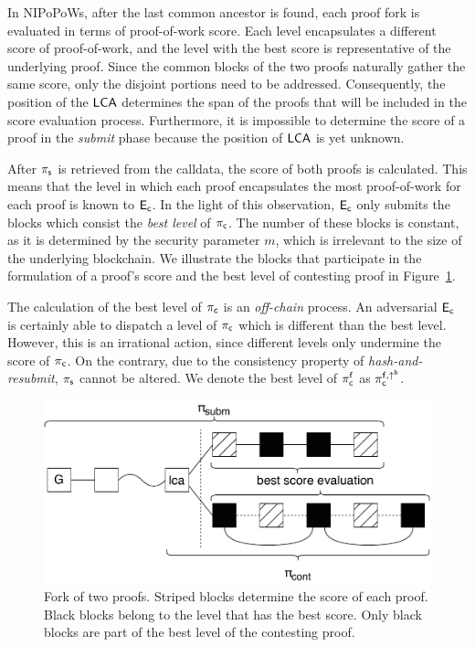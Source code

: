 In NIPoPoWs, after the last common ancestor is found, each proof fork
is evaluated in terms of proof-of-work score. Each level encapsulates a different
score of proof-of-work, and the level with the best score is representative
of the underlying proof. Since the common blocks of the two proofs naturally
gather the same score, only the disjoint portions need to be addressed.
Consequently, the position of the $\mathsf{LCA}$ determines the span of the proofs that
will be included in the score evaluation process. Furthermore, it is impossible
to determine the score of a proof in the \emph{submit} phase because the position
of $\mathsf{LCA}$ is yet unknown.

After $\mathsf{\pi_{s}}$ is retrieved from the calldata, the score of both proofs is
calculated. This means that the level in which each proof encapsulates the
most proof-of-work for each proof is known to $\mathsf{E_{c}}$. In the light of this
observation, $\mathsf{E_{c}}$ only submits the blocks which consist the \emph{best level}
of $\mathsf{\pi_{c}}$. The number of these blocks is constant, as it is determined by the
security parameter $m$, which is irrelevant to the size of the underlying
blockchain. We illustrate the blocks that participate in the formulation of a
proof's score and the best level of contesting proof in
Figure~\ref{fig:score-at-levels}.

The calculation of the best level of $\mathsf{\pi_{c}}$ is an \emph{off-chain} process.
An adversarial $\mathsf{E_{c}}$ is certainly able to dispatch a level of $\mathsf{\pi_{c}}$ which is
different than the best level. However, this is an irrational action, since
different levels only undermine the score of $\mathsf{\pi_{c}}$. On the contrary, due to
the consistency property of \emph{hash-and-resubmit}, $\mathsf{\pi_{s}}$ cannot be altered.
We denote the best level of $\mathsf{\pi_{c}^{f}}$ as $\mathsf{\pi_{c}^{f, \uparrow^{b}}}$.

\begin{figure}[!h]
\vspace*{-5mm}
    \begin{center}
        \includegraphics[width=0.8\columnwidth]{figures/blocks-of-best-level.pdf}
    \end{center}
    \caption{Fork of two proofs. Striped blocks determine the
    score of each proof. Black blocks belong to the level that
    has the best score. Only black blocks are part of the best level of the
    contesting proof.}
    \label{fig:score-at-levels}
\vspace*{-3mm}
\end{figure}

